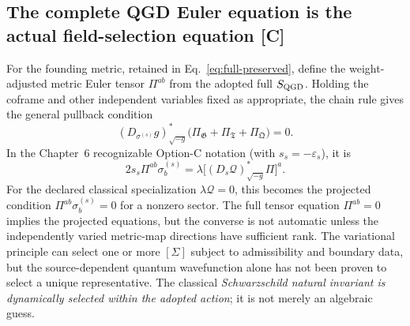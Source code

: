 \documentclass[11pt,a4paper]{article}
\begin{document}
\subsection{The complete QGD Euler equation is the actual field-selection equation [C]}\label{sec:qm010-optionC}
For the founding metric, retained in Eq.~\eqref{eq:full-preserved}, define the weight-adjusted metric Euler tensor $\Pi^{ab}$ from the adopted full $S_{\rm QGD}$. Holding the coframe and other independent variables fixed as appropriate, the chain rule gives the general pullback condition
\begin{equation}\label{eq:qm010-optionF}
\boxed{(D_{\sigma^{(s)}}g)^*_{\sqrt{-g}}\bigl(\Pi_{\mathfrak G}+\Pi_{\mathfrak T}+\Pi_{\mathfrak Q}\bigr)=0.}\end{equation}
In the Chapter~6 recognizable Option-C notation (with $s_s=-\varepsilon_s$), it is
\begin{equation}\label{eq:qm010-optionC}
\boxed{2s_s\Pi^{ab}\sigma_b^{(s)}
=\lambda\big[(D_s\mathcal Q)^*_{\sqrt{-g}}\Pi\big]^a.}\end{equation}
For the declared classical specialization $\lambda\mathcal Q=0$, this becomes the projected condition $\Pi^{ab}\sigma_b^{(s)}=0$ for a nonzero sector. The full tensor equation $\Pi^{ab}=0$ implies the projected equations, but the converse is not automatic unless the independently varied metric-map directions have sufficient rank. The variational principle can select one or more $[\Sigma]$ subject to admissibility and boundary data, but the source-dependent quantum wavefunction alone has not been proven to select a unique representative. The classical \emph{Schwarzschild natural invariant is dynamically selected within the adopted action}; it is not merely an algebraic guess.
\end{document}
